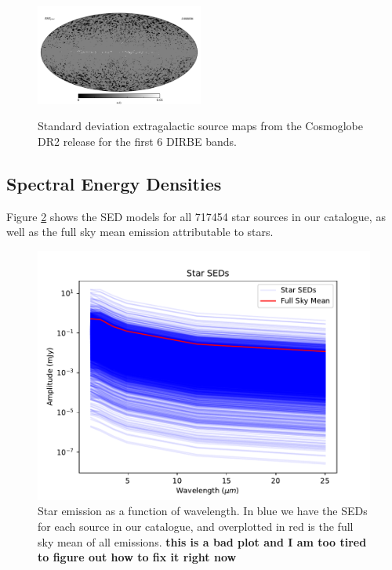 \documentclass{aa}
\begin{document}
\begin{figure}
  \includegraphics[width=0.49\textwidth]{figs/starmaps/ptsrc_std_06.pdf} \\
  \caption{Standard deviation extragalactic source maps from the Cosmoglobe DR2 release for the first 6 DIRBE bands. }
  \label{fig:exgalstd}
\end{figure}



\subsection{Spectral Energy Densities}

Figure \ref{fig:starSEDs} shows the SED models for all 717454 star sources in our catalogue, as well as the full sky mean emission attributable to stars. 

\begin{figure}
  \includegraphics[width=\columnwidth]{figs/starseds/star_seds.pdf}
  \caption{Star emission as a function of wavelength. In blue we have the SEDs for each source in our catalogue, and overplotted in red is the full sky mean of all emissions. \textbf{this is a bad plot and I am too tired to figure out how to fix it right now}}
  \label{fig:starSEDs}
\end{figure}
\end{document}
